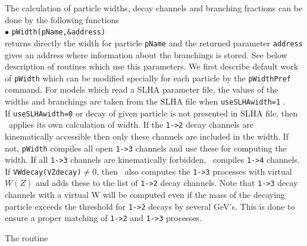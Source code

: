 \documentclass[12pt,a4paper]{article}
\begin{document}
The calculation of particle widths, decay channels  and branching fractions
can be done by the following functions\\[2mm]
%
\noindent
$\bullet$ \verb|pWidth(pName,&address)|\\
returns directly the width for  particle {\tt pName} and the returned  parameter \verb|address| 
gives  an address where information about the branchings is stored. See below description of routines which use this parameters. 
We first describe default work of {\tt pWidth} which can be modified specially for each particle by the {\tt pWidthPref} command.
For models which read a SLHA parameter file, the values of the widths and branchings are taken from the SLHA
file when \verb|useSLHAwidth=1| .\\[2mm] If \verb|useSLHAwidth=0| or decay of given particle is not presented in SLHA file, then \micro\ applies its own 
calculation of width.   If the  \verb|1->2| 
decay channels are kinematically accessible then only these channels are
included in the width. If not, {\tt pWidth} compiles all open \verb|1->3| channels and use these for  computing the width.
If all \verb|1->3| channels are kinematically forbidden, \micro\ compiles \verb|1->4| channels.
If \verb|VWdecay(VZdecay)|$\ne 0$, then \micro\  also computes   the \verb|1->3|   processes with virtual $W(Z)$  and adds these to the list of \verb|1->2| decay channels.
 Note that \verb|1->3| decay channels with a virtual W  will be computed even
if the mass of the decaying particle exceeds the threshold for \verb|1->2| decays by several GeV's. This is done to ensure a 
proper matching of \verb|1->2| and \verb|1->3| processes.

The routine 
\end{document}
